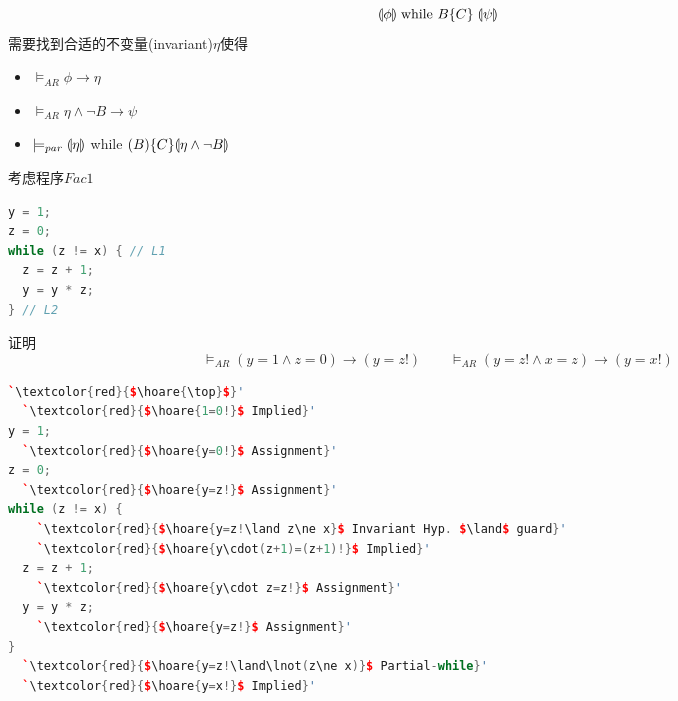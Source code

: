 \[\llparenthesis \phi\rrparenthesis\;\text{while }B\{C\}\;\llparenthesis \psi\rrparenthesis\]
需要找到合适的不变量(invariant)$\eta$使得
\begin{itemize}
	\item $\models_{AR}\phi\to\eta$
	\item $\models_{AR}\eta\land\lnot B\to\psi$
	\item $\models_{par}\llparenthesis \eta\rrparenthesis$ while $(B)\{C\}\llparenthesis \eta\land\lnot B\rrparenthesis$
\end{itemize}
\begin{example}
考虑程序$Fac1$
\begin{lstlisting}[language=c++]
y = 1;
z = 0;
while (z != x) { // L1
  z = z + 1;
  y = y * z;
} // L2
\end{lstlisting}
证明
\[\models_{AR}(y=1\land z=0)\to(y=z!)\qquad
\models_{AR}(y=z!\land x=z)\to(y=x!)\]
\begin{lstlisting}[language=c++]
  `\textcolor{red}{$\hoare{\top}$}'
  `\textcolor{red}{$\hoare{1=0!}$ Implied}'
y = 1;
  `\textcolor{red}{$\hoare{y=0!}$ Assignment}'
z = 0;
  `\textcolor{red}{$\hoare{y=z!}$ Assignment}'
while (z != x) {
    `\textcolor{red}{$\hoare{y=z!\land z\ne x}$ Invariant Hyp. $\land$ guard}'
    `\textcolor{red}{$\hoare{y\cdot(z+1)=(z+1)!}$ Implied}'
  z = z + 1;
    `\textcolor{red}{$\hoare{y\cdot z=z!}$ Assignment}'
  y = y * z;
    `\textcolor{red}{$\hoare{y=z!}$ Assignment}'
}
  `\textcolor{red}{$\hoare{y=z!\land\lnot(z\ne x)}$ Partial-while}'
  `\textcolor{red}{$\hoare{y=x!}$ Implied}'
\end{lstlisting}
\end{example}